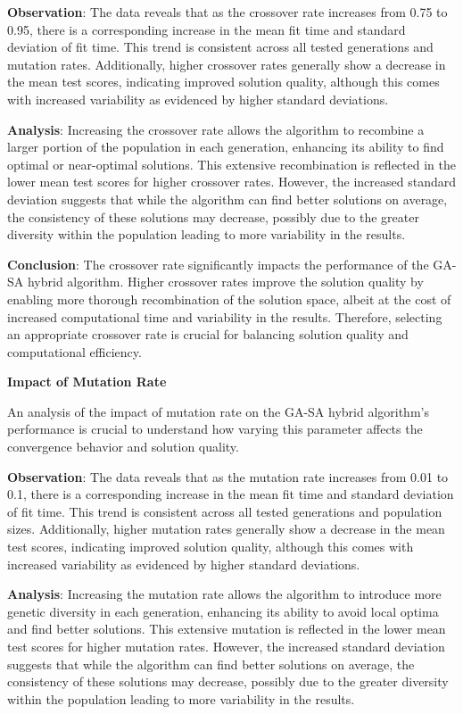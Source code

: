 \documentclass[
]{article}
\begin{document}
    \textbf{Observation}: The data reveals that as the crossover rate increases from 0.75 to 0.95, there is a corresponding increase in the mean fit time and standard deviation of fit time. This trend is consistent across all tested generations and mutation rates. Additionally, higher crossover rates generally show a decrease in the mean test scores, indicating improved solution quality, although this comes with increased variability as evidenced by higher standard deviations.

    \textbf{Analysis}: Increasing the crossover rate allows the algorithm to recombine a larger portion of the population in each generation, enhancing its ability to find optimal or near-optimal solutions. This extensive recombination is reflected in the lower mean test scores for higher crossover rates. However, the increased standard deviation suggests that while the algorithm can find better solutions on average, the consistency of these solutions may decrease, possibly due to the greater diversity within the population leading to more variability in the results.

    \textbf{Conclusion}: The crossover rate significantly impacts the performance of the GA-SA hybrid algorithm. Higher crossover rates improve the solution quality by enabling more thorough recombination of the solution space, albeit at the cost of increased computational time and variability in the results. Therefore, selecting an appropriate crossover rate is crucial for balancing solution quality and computational efficiency.

    \textbf{Impact of Mutation Rate}

    An analysis of the impact of mutation rate on the GA-SA hybrid algorithm’s performance is crucial to understand how varying this parameter affects the convergence behavior and solution quality.

    \textbf{Observation}: The data reveals that as the mutation rate increases from 0.01 to 0.1, there is a corresponding increase in the mean fit time and standard deviation of fit time. This trend is consistent across all tested generations and population sizes. Additionally, higher mutation rates generally show a decrease in the mean test scores, indicating improved solution quality, although this comes with increased variability as evidenced by higher standard deviations.

    \textbf{Analysis}: Increasing the mutation rate allows the algorithm to introduce more genetic diversity in each generation, enhancing its ability to avoid local optima and find better solutions. This extensive mutation is reflected in the lower mean test scores for higher mutation rates. However, the increased standard deviation suggests that while the algorithm can find better solutions on average, the consistency of these solutions may decrease, possibly due to the greater diversity within the population leading to more variability in the results.
\end{document}
